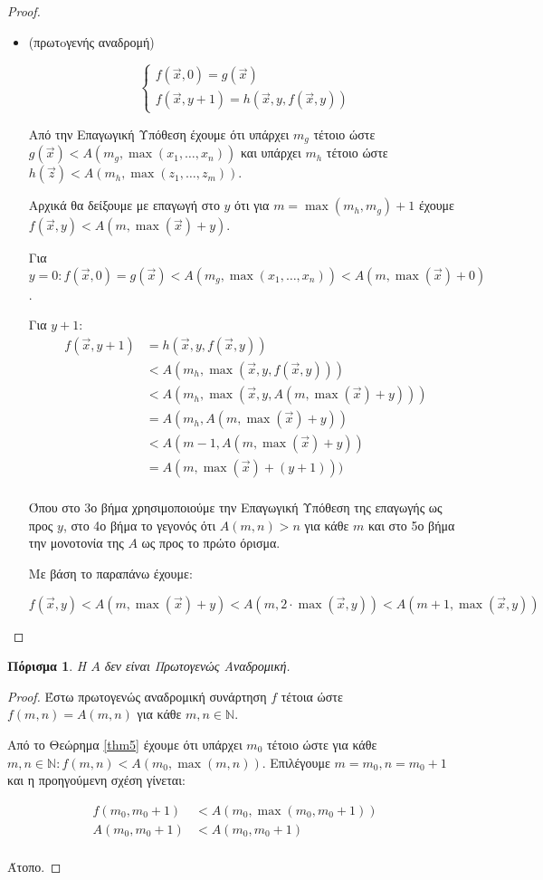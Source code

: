 \documentclass[a4paper, oneside, 11pt]{article}
\newtheorem{col}[thm]{Πόρισμα}
\theoremstyle{definition}
\newcommand{\ora}{\vec}
\begin{document}
\begin{proof}
\begin{itemize}
\item (πρωτoγενής αναδρομή)

\[ \left\{ \begin{array}{l}
f(\ora{x}, 0) = g(\ora{x})\\
f(\ora{x}, y+1) = h(\ora{x}, y, f(\ora{x}, y))
\end{array} \right.
\]

Από την Επαγωγική Υπόθεση έχουμε ότι υπάρχει $m_g$ τέτοιο ώστε $g(\ora{x}) <
A(m_g, \max(x_1, \ldots, x_n))$ και υπάρχει $m_h$ τέτοιο ώστε $h(\ora{z})
< A(m_h, \max(z_1, \ldots, z_m))$.

Αρχικά θα δείξουμε με επαγωγή στο $y$ ότι για $m = \max(m_h, m_g) + 1$
έχουμε $f(\ora{x}, y) < A(m, \max(\ora{x}) + y)$.

Για $y = 0: f(\ora{x}, 0) = g(\ora{x}) < A(m_g, \max(x_1, \ldots, x_n)) < A(m,
\max(\ora{x}) + 0)$.

Για $y+1$:
\begin{align*}
f(\ora{x}, y+1) &= h(\ora{x}, y, f(\ora{x}, y))\\
                &< A(m_h, \max(\ora{x}, y, f(\ora{x}, y)))\\
                &< A(m_h, \max(\ora{x}, y, A(m, \max(\ora{x}) + y)))\\
                &= A(m_h, A(m, \max(\ora{x})+y))\\
                &< A(m-1, A(m, \max(\ora{x})+y))\\
                &= A(m, \max(\ora{x}) + (y + 1)))\\
\end{align*}

Όπου στο 3ο βήμα χρησιμοποιούμε την Επαγωγική Υπόθεση της επαγωγής ως προς $y$,
στο 4ο βήμα το γεγονός ότι $A(m, n) > n$ για κάθε $m$ και στο 5ο βήμα την
μονοτονία της $A$ ως προς το πρώτο όρισμα.

Με βάση το παραπάνω έχουμε:

\[ f(\ora{x}, y) < A(m, \max(\ora{x}) + y) < A(m, 2\cdot \max(\ora{x}, y)) <
A(m+1, \max(\ora{x}, y)) \]

\end{itemize}
\end{proof}

\begin{col}
Η $A$ δεν είναι Πρωτογενώς Αναδρομική.
\end{col}
\begin{proof}
Έστω πρωτογενώς αναδρομική συνάρτηση $f$ τέτοια ώστε $f(m, n) = A(m, n)$ για
κάθε $m, n \in \mathbb{N}$.

Από το Θεώρημα \ref{thm5} έχουμε ότι υπάρχει $m_0$ τέτοιο ώστε για κάθε $m, n
\in \mathbb{N}: f(m, n) < A(m_0, \max(m, n))$. Επιλέγουμε $m = m_0, n = m_0 + 1$
και η προηγούμενη σχέση γίνεται:

\begin{align*}
   f(m_0, m_0+1) &< A(m_0, \max(m_0, m_0+1))\\
   A(m_0, m_0+1) &< A(m_0, m_0+1)\\
\end{align*}

Άτοπο.
\end{proof}
\end{document}
